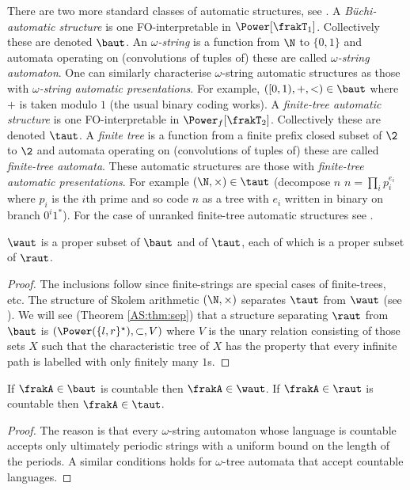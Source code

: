 There are two more standard classes of automatic structures, see \cite{Blum99}.
A {\em B\"uchi-automatic structure} is one FO-interpretable in $\Power[\frakT_1]$. Collectively these are denoted $\baut$. An {\em $\omega$-string} is a function from $\N$ to $\{0,1\}$ and automata operating on (convolutions of tuples of) these are called {\em $\omega$-string automaton}. One can similarly characterise $\omega$-string automatic structures as those with {\em $\omega$-string automatic presentations}. For example, $([0,1),+,<) \in \baut$ where $+$ is taken modulo $1$ (the usual binary coding works).
A {\em finite-tree automatic structure} is one FO-interpretable in $\Power_f[\frakT_2]$. Collectively these are denoted $\taut$. A {\em finite tree} is a function from a finite prefix closed subset of $\2$ to $\2$ and automata operating on (convolutions of tuples of) these are called {\em finite-tree automata}. These automatic structures are those with {\em finite-tree automatic presentations}. For example  $(\N,\times) \in \taut$ (decompose $n$ 
$n=\prod_{i} p_i^{e_i}$ where $p_i$ is the $i$th prime and so code $n$ as a tree with $e_i$ written in binary on
branch $0^i1^\ast$).  For the case of unranked finite-tree automatic structures see \cite{BeLiNe07}.


\begin{proposition} \label{AS:prop:relations}
$\waut$ is a proper subset of $\baut$ and of $\taut$, each of which is a proper subset of $\raut$.
\end{proposition} 

\begin{proof} The inclusions follow since finite-strings are special cases of finite-trees, etc.
The structure of Skolem arithmetic $(\N,\times)$ separates $\taut$ from $\waut$ (see \cite{Blum99}).
We will see (Theorem \ref{AS:thm:sep}) that a structure separating $\raut$ from $\baut$ is $(\Power(\{l,r\}^\star),\subset,V)$ where $V$ is the unary relation consisting of those sets $X$ such that the characteristic tree of $X$ has the property that every infinite path is labelled with only finitely many $1$s.
\end{proof}

\begin{proposition}
If $\frakA \in \baut$ is countable then $\frakA \in \waut$.
If $\frakA \in \raut$ is countable then $\frakA \in \taut$.
\end{proposition}

\begin{proof}
The reason is that every $\omega$-string automaton whose language is countable accepts only ultimately periodic strings with a uniform bound on the length of the periods. A similar conditions holds for $\omega$-tree automata that accept countable languages.
\end{proof}

